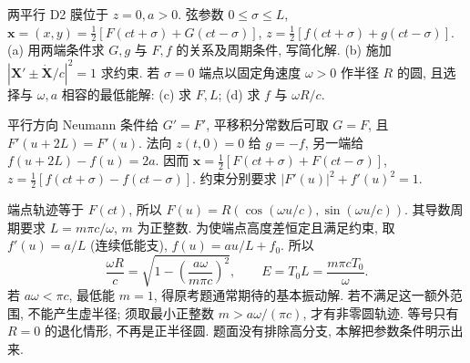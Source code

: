 \begin{exercise}
两平行 D2 膜位于 $z=0,a>0$. 弦参数 $0\le\sigma\le L$, $\boldsymbol x=(x,y)=\frac12[F(ct+\sigma)+G(ct-\sigma)]$, $z=\frac12[f(ct+\sigma)+g(ct-\sigma)]$.
(a) 用两端条件求 $G,g$ 与 $F,f$ 的关系及周期条件, 写简化解.
(b) 施加 $|\boldsymbol X'\pm\dot{\boldsymbol X}/c|^2=1$ 求约束.
若 $\sigma=0$ 端点以固定角速度 $\omega>0$ 作半径 $R$ 的圆, 且选择与 $\omega,a$ 相容的最低能解:
(c) 求 $F,L$; (d) 求 $f$ 与 $\omega R/c$.
\end{exercise}
\begin{solution}
平行方向 Neumann 条件给 $G'=F'$, 平移积分常数后可取 $G=F$, 且 $F'(u+2L)=F'(u)$. 法向 $z(t,0)=0$ 给 $g=-f$, 另一端给 $f(u+2L)-f(u)=2a$. 因而 $\boldsymbol x=\frac12[F(ct+\sigma)+F(ct-\sigma)]$, $z=\frac12[f(ct+\sigma)-f(ct-\sigma)]$. 约束分别要求 $|F'(u)|^2+f'(u)^2=1$.

端点轨迹等于 $F(ct)$, 所以 $F(u)=R(\cos(\omega u/c),\sin(\omega u/c))$. 其导数周期要求 $L=m\pi c/\omega$, $m$ 为正整数. 为使端点高度差恒定且满足约束, 取 $f'(u)=a/L$ (连续低能支), $f(u)=au/L+f_0$. 所以
\[
\frac{\omega R}c=\sqrt{1-\left(\frac{a\omega}{m\pi c}\right)^2},\qquad
E=T_0L=\frac{m\pi cT_0}{\omega}.
\]
若 $a\omega<\pi c$, 最低能 $m=1$, 得原考题通常期待的基本振动解. 若不满足这一额外范围, 不能产生虚半径; 须取最小正整数 $m>a\omega/(\pi c)$, 才有非零圆轨迹. 等号只有 $R=0$ 的退化情形, 不再是正半径圆. 题面没有排除高分支, 本解把参数条件明示出来.
\end{solution}
